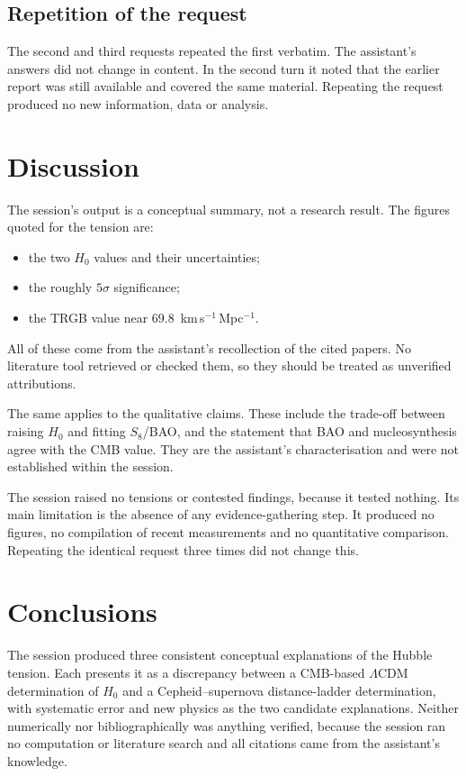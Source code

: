 \documentclass[11pt,a4paper]{article}
\begin{document}
\subsection{Repetition of the request}
The second and third requests repeated the first verbatim. The assistant's answers did not change in content. In the second turn it noted that the earlier report was still available and covered the same material. Repeating the request produced no new information, data or analysis.

\section{Discussion}
The session's output is a conceptual summary, not a research result. The figures quoted for the tension are:
\begin{itemize}
\item the two $H_0$ values and their uncertainties;
\item the roughly $5\sigma$ significance;
\item the TRGB value near $69.8$~km\,s$^{-1}$\,Mpc$^{-1}$.
\end{itemize}
All of these come from the assistant's recollection of the cited papers. No literature tool retrieved or checked them, so they should be treated as unverified attributions.

The same applies to the qualitative claims. These include the trade-off between raising $H_0$ and fitting $S_8$/BAO, and the statement that BAO and nucleosynthesis agree with the CMB value. They are the assistant's characterisation and were not established within the session.

The session raised no tensions or contested findings, because it tested nothing. Its main limitation is the absence of any evidence-gathering step. It produced no figures, no compilation of recent measurements and no quantitative comparison. Repeating the identical request three times did not change this.

\section{Conclusions}
The session produced three consistent conceptual explanations of the Hubble tension. Each presents it as a discrepancy between a CMB-based $\Lambda$CDM determination of $H_0$ and a Cepheid--supernova distance-ladder determination, with systematic error and new physics as the two candidate explanations. Neither numerically nor bibliographically was anything verified, because the session ran no computation or literature search and all citations came from the assistant's knowledge.
\end{document}
